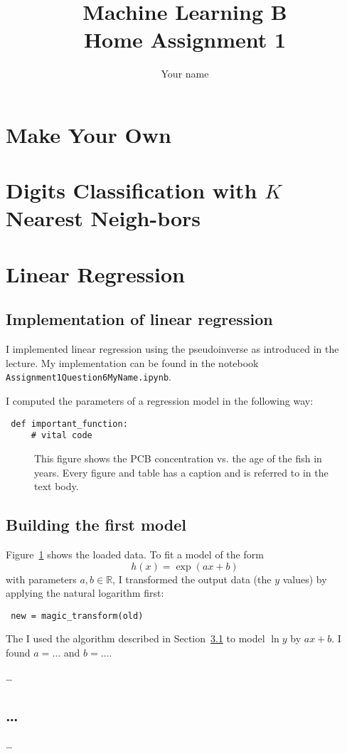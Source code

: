 \documentclass[a4paper,12pt]{article}
\begin{document}
\title{Machine Learning B\\Home Assignment 1}
\author{\color{red}Your name}
\date{}
\maketitle



\section{Make Your Own}



\section{Digits  Classification  with $K$ Nearest  Neigh-bors}




\section{Linear Regression}
\subsection{Implementation of linear regression}\label{sec:lr_imp}
I implemented linear regression using the pseudoinverse as introduced
in the lecture. My implementation can be found in the notebook
\texttt{Assignment1Question6MyName.ipynb}.

I computed the parameters of a regression model in the following way:
\begin{lstlisting}
 def important_function:
     # vital code
\end{lstlisting}



\begin{figure}
  \begin{center}
  \end{center}
  \caption{This figure shows the PCB concentration vs.{} the age of
    the fish in years.
    Every figure and table has a caption and is referred to 
    in the text body.\label{fig:q6p1}}
\end{figure}
\subsection{Building the first model}
Figure~\ref{fig:q6p1} shows the loaded data.
To fit a model of the form
\begin{equation*}
 h(x) = \exp(ax+b) 
 \end{equation*}
 with parameters $a,b\in\mathbb R$, I transformed the output data (the
 $y$ values) by applying the natural logarithm first:
\begin{lstlisting}
 new = magic_transform(old)
\end{lstlisting}
The I used the algorithm described in Section~\ref{sec:lr_imp}
to model $\ln y$ by $ax+b$.
I found $a=\dots$ and $b=\dots$.

\noindent\dots 
\subsection{\dots}
\dots 

\end{document}
